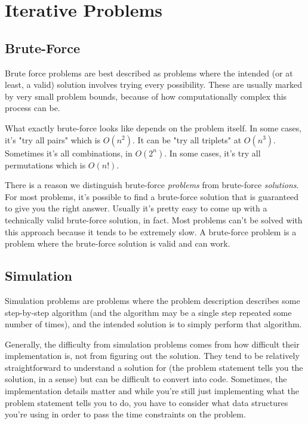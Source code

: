 \section{Iterative Problems}
\subsection{Brute-Force}

Brute force problems are best described as problems where the intended (or at least, a valid) solution involves trying every possibility. These are usually marked by very small problem bounds, because of how computationally complex this process can be.

What exactly brute-force looks like depends on the problem itself. In some cases, it's "try all pairs" which is $O(n^2)$. It can be "try all triplets" at $O(n^3)$. Sometimes it's all combinations, in $O(2^n)$. In some cases, it's try all permutations which is $O(n!)$.

There is a reason we distinguish brute-force \textit{problems} from brute-force \textit{solutions}. For most problems, it's possible to find a brute-force solution that is guaranteed to give you the right answer. Usually it's pretty easy to come up with a technically valid brute-force solution, in fact. Most problems can't be solved with this approach because it tends to be extremely slow. A brute-force problem is a problem where the brute-force solution is valid and can work.

\subsection{Simulation}

Simulation problems are problems where the problem description describes some step-by-step algorithm (and the algorithm may be a single step repeated some number of times), and the intended solution is to simply perform that algorithm.

Generally, the difficulty from simulation problems comes from how difficult their implementation is, not from figuring out the solution. They tend to be relatively straightforward to understand a solution for (the problem statement tells you the solution, in a sense) but can be difficult to convert into code. Sometimes, the implementation details matter and while you're still just implementing what the problem statement tells you to do, you have to consider what data structures you're using in order to pass the time constraints on the problem.

